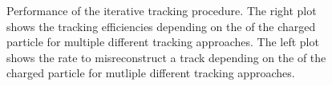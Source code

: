 \begin{figure}[htbp!]
  \begin{center}
\caption{Performance of the iterative tracking procedure\cite{Sirunyan:2017ulk}. The right plot shows the tracking efficiencies depending on the \pt of the charged particle for multiple different tracking approaches. 
         The left plot shows the rate to misreconstruct a track depending on the \pt of the charged particle for mutliple different tracking approaches. 
  \label{fig:trackingEff}}
  \end{center}
\end{figure}

